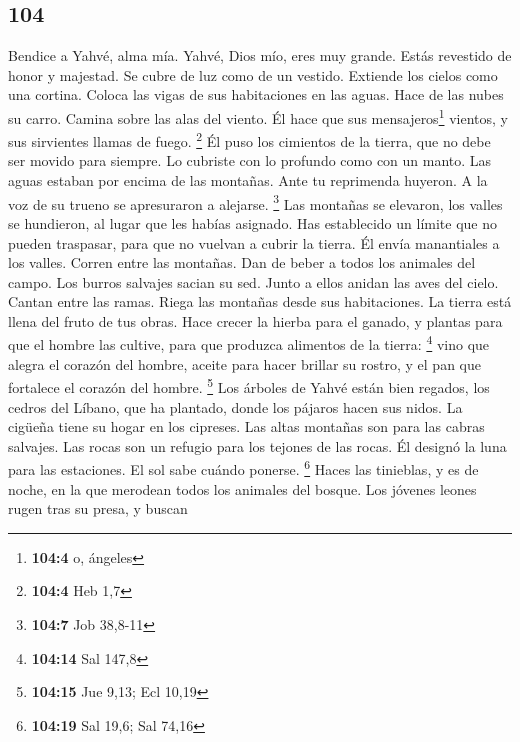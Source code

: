 \begin{paracol}{2}
\hypertarget{section-206}{%
\section{104}\label{section-206}}

 Bendice a Yahvé, alma mía. Yahvé, Dios mío, eres muy
grande. Estás revestido de honor y majestad.  Se cubre de
luz como de un vestido. Extiende los cielos como una cortina.
 Coloca las vigas de sus habitaciones en las aguas. Hace
de las nubes su carro. Camina sobre las alas del viento. 
Él hace que sus mensajeros\footnote{\textbf{104:4} o, ángeles} vientos,
y sus sirvientes llamas de fuego. \footnote{\textbf{104:4} Heb 1,7}
 Él puso los cimientos de la tierra, que no debe ser
movido para siempre.  Lo cubriste con lo profundo como con
un manto. Las aguas estaban por encima de las montañas. 
Ante tu reprimenda huyeron. A la voz de su trueno se apresuraron a
alejarse. \footnote{\textbf{104:7} Job 38,8-11}  Las
montañas se elevaron, los valles se hundieron, al lugar que les habías
asignado.  Has establecido un límite que no pueden
traspasar, para que no vuelvan a cubrir la tierra.  Él
envía manantiales a los valles. Corren entre las montañas.
 Dan de beber a todos los animales del campo. Los burros
salvajes sacian su sed.  Junto a ellos anidan las aves
del cielo. Cantan entre las ramas.  Riega las montañas
desde sus habitaciones. La tierra está llena del fruto de tus obras.
 Hace crecer la hierba para el ganado, y plantas para que
el hombre las cultive, para que produzca alimentos de la tierra:
\footnote{\textbf{104:14} Sal 147,8}  vino que alegra el
corazón del hombre, aceite para hacer brillar su rostro, y el pan que
fortalece el corazón del hombre. \footnote{\textbf{104:15} Jue 9,13; Ecl
  10,19}  Los árboles de Yahvé están bien regados, los
cedros del Líbano, que ha plantado,  donde los pájaros
hacen sus nidos. La cigüeña tiene su hogar en los cipreses.
 Las altas montañas son para las cabras salvajes. Las
rocas son un refugio para los tejones de las rocas.  Él
designó la luna para las estaciones. El sol sabe cuándo ponerse.
\footnote{\textbf{104:19} Sal 19,6; Sal 74,16}  Haces las
tinieblas, y es de noche, en la que merodean todos los animales del
bosque.  Los jóvenes leones rugen tras su presa, y buscan

\end{paracol}
